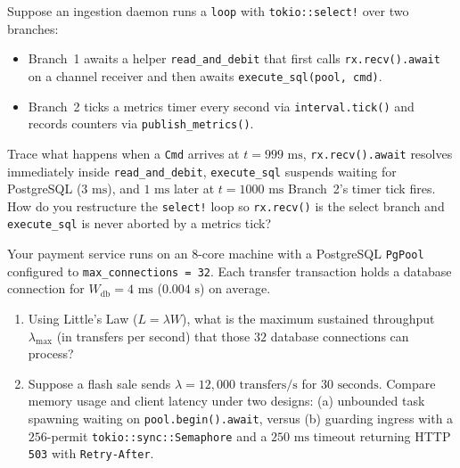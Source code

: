 \begin{exercise}
Suppose an ingestion daemon runs a \texttt{loop} with \texttt{tokio::select!} over two branches:
\begin{itemize}
  \item Branch~1 awaits a helper \texttt{read\_and\_debit} that first calls \texttt{rx.recv().await} on a channel receiver and then awaits \texttt{execute\_sql(pool, cmd)}.
  \item Branch~2 ticks a metrics timer every second via \texttt{interval.tick()} and records counters via \texttt{publish\_metrics()}.
\end{itemize}
Trace what happens when a \texttt{Cmd} arrives at $t = 999\text{ ms}$, \texttt{rx.recv().await} resolves immediately inside \texttt{read\_and\_debit}, \texttt{execute\_sql} suspends waiting for PostgreSQL ($3\text{ ms}$), and $1\text{ ms}$ later at $t = 1000\text{ ms}$ Branch~2's timer tick fires. How do you restructure the \texttt{select!} loop so \texttt{rx.recv()} is the select branch and \texttt{execute\_sql} is never aborted by a metrics tick?
\end{exercise}

\begin{exercise}
Your payment service runs on an 8-core machine with a PostgreSQL \texttt{PgPool} configured to \texttt{max\_connections = 32}. Each transfer transaction holds a database connection for $W_{\text{db}} = 4\text{ ms}$ ($0.004\text{ s}$) on average.
\begin{enumerate}
  \item Using Little's Law ($L = \lambda W$), what is the maximum sustained throughput $\lambda_{\max}$ (in transfers per second) that those $32$ database connections can process?
  \item Suppose a flash sale sends $\lambda = 12{,}000\text{ transfers/s}$ for $30\text{ seconds}$. Compare memory usage and client latency under two designs: (a) unbounded task spawning waiting on \texttt{pool.begin().await}, versus (b) guarding ingress with a $256$-permit \texttt{tokio::sync::Semaphore} and a $250\text{ ms}$ timeout returning HTTP \texttt{503} with \texttt{Retry-After}.
\end{enumerate}
\end{exercise}
